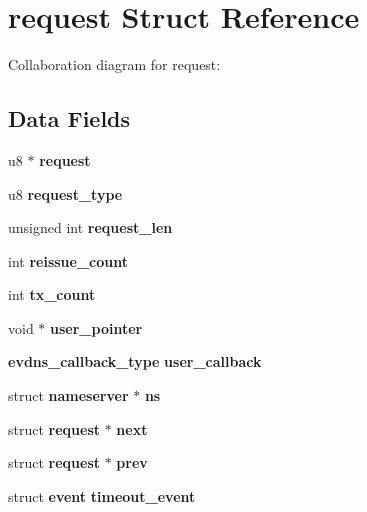 \section{request \-Struct \-Reference}
\label{structrequest}


\-Collaboration diagram for request\-:
\subsection*{\-Data \-Fields}
\begin{DoxyCompactItemize}
\item 
u8 $\ast$ {\bfseries request}\label{structrequest_acd2e406359aa8d36cdc983a27869f631}

\item 
u8 {\bfseries request\-\_\-type}\label{structrequest_a364f25eba29acdf087603b287353679e}

\item 
unsigned int {\bfseries request\-\_\-len}\label{structrequest_a527a49d297f9dd8fac6e13828b40679d}

\item 
int {\bfseries reissue\-\_\-count}\label{structrequest_a418e362fcadc1b8445554372c9d65f06}

\item 
int {\bfseries tx\-\_\-count}\label{structrequest_a1c77f4b9a3f3e20cc7afe18e5ce53835}

\item 
void $\ast$ {\bfseries user\-\_\-pointer}\label{structrequest_a4ccad38d45731fd5ea4b01a00f9913cc}

\item 
{\bf evdns\-\_\-callback\-\_\-type} {\bfseries user\-\_\-callback}\label{structrequest_a3c73b9b881ce36d9a4241033971633ff}

\item 
struct {\bf nameserver} $\ast$ {\bfseries ns}\label{structrequest_ac921a6914804901c67fb39ed2c25cce2}

\item 
struct {\bf request} $\ast$ {\bfseries next}\label{structrequest_aa9f2eef383fc838290a703598e3f7af6}

\item 
struct {\bf request} $\ast$ {\bfseries prev}\label{structrequest_af29796143fbf20be9fd85830057079ee}

\item 
struct {\bf event} {\bfseries timeout\-\_\-event}\label{structrequest_aa2277fcb92b9a06b28d65f3d638ed474}


\end{DoxyCompactItemize}
